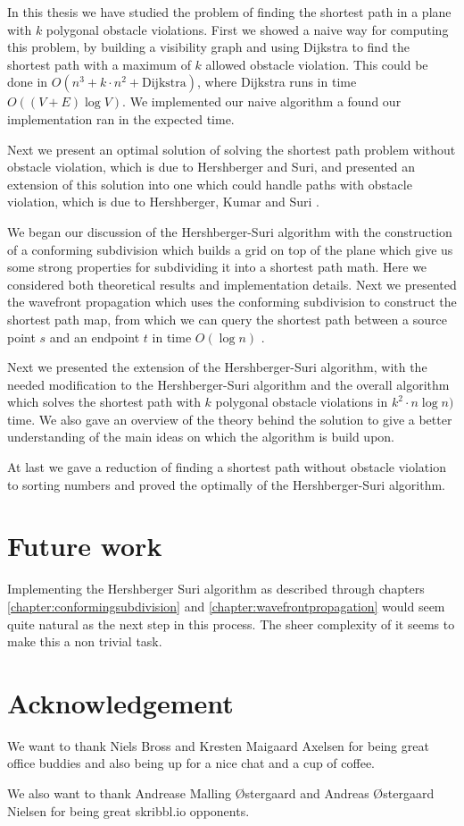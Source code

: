 In this thesis we have studied the problem of finding the shortest path in a plane with $k$ 
polygonal obstacle violations. First we showed a naive way for computing this problem, by 
building a visibility graph and using Dijkstra to find the shortest path with a maximum of 
$k$ allowed obstacle violation. This could be done in $O(n^3 + k \cdot n^2 + \text{Dijkstra})$, 
where Dijkstra runs in time $O((V + E) \log V)$. We implemented our naive algorithm a found 
our implementation ran in the expected time. 

Next we present an optimal solution of solving the shortest path problem without obstacle violation, 
which is due to Hershberger and Suri\cite{HershbergerS99}, and presented an extension of this solution 
into one which could handle paths with obstacle violation, which is due to Hershberger, Kumar and Suri
\cite{HershbergerKS17}. 

We began our discussion of the Hershberger-Suri algorithm with the construction of a conforming 
subdivision which builds a grid on top of the plane which give us some strong properties for subdividing 
it into a shortest path math. Here we considered both theoretical results and implementation details. 
Next we presented the wavefront propagation which uses the conforming subdivision to construct 
the shortest path map, from which we can query the shortest path between a source point $s$ 
and an endpoint $t$ in time $O(\log n)$ \cite{DBLP:journals/siamcomp/Kirkpatrick83}. 

Next we presented the extension of the Hershberger-Suri algorithm, with the needed modification
to the Hershberger-Suri algorithm and the overall algorithm which solves the shortest path with
$k$ polygonal obstacle violations in $k^2 \cdot n \log n)$ time. We also gave an overview of the
theory behind the solution to give a better understanding of the main ideas on which the algorithm
is build upon.

At last we gave a reduction of finding a shortest path without obstacle violation to sorting numbers
and proved the optimally of the Hershberger-Suri algorithm.

\section{Future work}

Implementing the Hershberger Suri algorithm as described through chapters \ref{chapter:conformingsubdivision} and 
\ref{chapter:wavefrontpropagation} would seem quite natural as the next step in this process. The sheer complexity
of it seems to make this a non trivial task. 

\section*{Acknowledgement}

We want to thank Niels Bross and Kresten Maigaard Axelsen for being great office buddies and also being up for a nice chat and a cup of coffee. 

We also want to thank Andrease Malling Østergaard and Andreas Østergaard Nielsen for being great skribbl.io opponents. 

